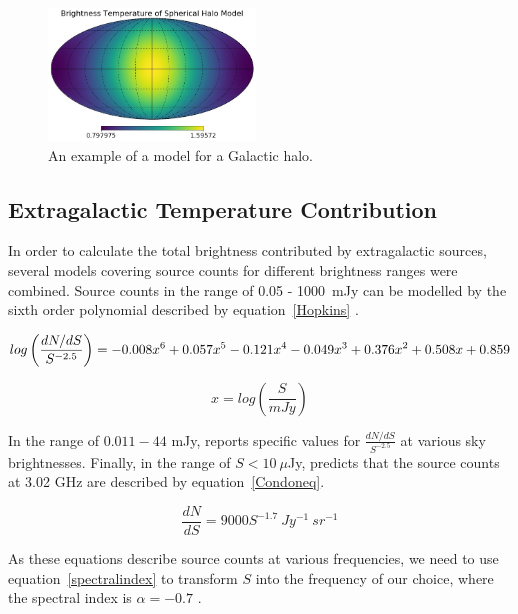 \documentclass[%
onecolumn,
11pt,
tightenlines,
notitlepage,
superscriptaddress,
nofootinbib,
amsmath,amssymb,
aps,
pra,
]{revtex4-1}
\begin{document}
\begin{figure}[h]
\begin{center}
\includegraphics[width=0.49\textwidth]{example_halo.jpg}
\caption{An example of a model for a Galactic halo.}
\label{halo_model}
\end{center}
\end{figure}



\subsection{Extragalactic Temperature Contribution}
In order to calculate the total brightness contributed by extragalactic sources, several models covering source counts for different brightness ranges were combined. Source counts in the range of 0.05 - 1000\ mJy can be modelled by the sixth order polynomial described by equation~\ref{Hopkins} \citep{Hopkins2003}. 

\begin{equation}
log\left(\frac{dN/dS}{S^{-2.5}}\right) = -0.008x^{6} + 0.057x^{5} - 0.121x^{4} - 0.049x^{3} + 0.376x^{2} + 0.508x + 0.859 \\
\label{Hopkins}
\end{equation}

\begin{equation*}
x = log\left(\frac{S}{mJy}\right)
\end{equation*}

In the range of $0.011-44$ mJy, \cite{Smolcic2017} reports specific values for $\frac{dN/dS}{S^{-2.5}}$ at various sky brightnesses. Finally, in the range of $ S < 10\ \mu$Jy, \cite{Condon2012} predicts that the source counts at 3.02 GHz are described by equation~\ref{Condoneq}.

\begin{equation}
\frac{dN}{dS} = 9000S^{-1.7}\ Jy^{-1}\ sr^{-1}
\label{Condoneq} 
\end{equation}

As these equations describe source counts at various frequencies, we need to use equation~\ref{spectralindex} to transform $S$ into the frequency of our choice, where the spectral index is $ \alpha = -0.7$ \citep{Condon2012}.
\end{document}
